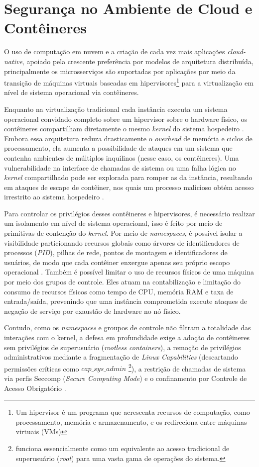 \section{Segurança no Ambiente de Cloud e Contêineres}


O uso de computação em nuvem e a criação de cada vez mais aplicações \emph{cloud-native}, apoiado pela crescente preferência por modelos de arquitetura distribuída, principalmente os microsserviços são suportadas por aplicações por meio da transição de máquinas virtuais baseadas em hipervisores\footnote{Um hipervisor é um programa que acrescenta recursos de computação, como processamento, memória e armazenamento, e os redireciona entre máquinas virtuais (VMs)} para a virtualização em nível de sistema operacional via contêineres.

Enquanto na virtualização tradicional cada instância executa um sistema operacional convidado completo sobre um hipervisor sobre o hardware físico, os contêineres compartilham diretamente o mesmo \emph{kernel} do sistema hospedeiro \cite{sultan2019container}. Embora essa arquitetura reduza drasticamente o \emph{overhead} de memória e ciclos de processamento, ela aumenta a possibilidade de ataques em um sistema que contenha ambientes de múltiplos inquilinos (nesse caso, os contêineres). Uma vulnerabilidade na interface de chamadas de sistema ou uma falha lógica no \emph{kernel} compartilhado pode ser explorada para romper as da instância, resultando em ataques de escape de contêiner, nos quais um processo malicioso obtém acesso irrestrito ao sistema hospedeiro \cite{souppaya2017nist}.

Para controlar os privilégios desses contêineres e hipervisores, é necessário realizar um isolamento em nível de sistema operacional, isso é feito por meio de  primitivas de contenção do \emph{kernel}. Por meio de \emph{namespaces}, é possível isolar a visibilidade particionando recursos globais como árvores de identificadores de processos (\emph{PID}), pilhas de rede, pontos de montagem e identificadores de usuários, de modo que cada contêiner enxergue apenas seu próprio escopo operacional \cite{rice2020container}. Também é possível limitar o uso de recursos físicos de uma máquina por meio dos grupos de controle. Eles atuam na contabilização e limitação do consumo de recursos físicos como tempo de CPU, memória RAM e taxa de entrada/saída, prevenindo que uma instância comprometida execute ataques de negação de serviço por exaustão de hardware no nó físico.

Contudo, como os \emph{namespaces} e groupos de controle não filtram a totalidade das interações com o kernel, a defesa em profundidade exige a adoção de contêineres sem privilégios de superusuário (\emph{rootless containers}), a remoção de privilégios administrativos mediante a fragmentação de \emph{Linux Capabilities} (descartando permissões críticas como $cap\_sys\_admin$ \footnote{funciona essencialmente como um equivalente ao acesso tradicional de superusuário (\emph{root}) para uma vasta gama de operações do sistema.}), a restrição de chamadas de sistema via perfis Seccomp (\emph{Secure Computing Mode}) e o confinamento por Controle de Acesso Obrigatório \cite{rice2020container}.


